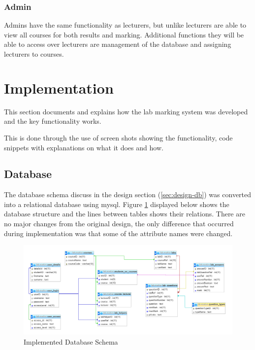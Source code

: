 \documentclass[12pt]{article}  %
\begin{document}
\subsubsection*{Admin}
Admins have the same functionality as lecturers, but unlike lecturers are able to view all courses for both results and marking. Additional functions they will be able to access over lecturers are management of the database and assigning lecturers to courses.







\newpage
\section{Implementation}
This section documents and explains how the lab marking system was developed and the key functionality works. 

This is done through the use of screen shots showing the functionality, code snippets with explanations on what it does and how.   

\subsection{Database}

The database schema discuss in the design section (\ref{sec:design-db}) was converted into a relational database using mysql. Figure \ref{fig:implement-db} displayed below shows the database structure and the lines between tables shows their relations. There are no major changes from the original design, the only difference that occurred during implementation was that some of the attribute names were changed.  

\begin{figure}[H]
    \centering
    \includegraphics[width=1\textwidth]{images/implementation/database.png}
    \caption{Implemented Database Schema}
    \label{fig:implement-db}
\end{figure}
\end{document}
